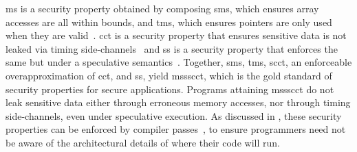 \documentclass[dvipsnames,conference]{IEEEtran}
\theoremstyle{definition}
\begin{document}

\gls*{ms} is a security property obtained by composing \gls*{sms}, which ensures array accesses are all within bounds, and \gls*{tms}, which ensures pointers are only used when they are valid~\cite{azevedo2018meaningsofms,jim2002cyclone,necula2005ccured,nagarakatte2010cets,nagarakatte2009soft,akritidis2009baggy,michael2023mswasm}.
\gls*{cct} is a security property that ensures sensitive data is not leaked via timing side-channels~\cite{kocher1996timing} and \gls*{ss} is a security property that enforces the same but under a speculative semantics~\cite{guarnieri2018spectector}.
Together, \gls*{sms}, \gls*{tms}, \gls*{scct}, an enforceable overapproximation of \gls*{cct}, and \gls*{ss}, yield \gls*{mssscct}, which is the gold standard of security properties for secure applications.
Programs attaining \gls*{mssscct} do not leak sensitive data either through erroneous memory accesses, nor through timing side-channels, even under speculative execution.
As discussed in , these security properties can be enforced by compiler passes~\cite{bond2017vale,almeida2017jasmin}, to ensure programmers need not be aware of the architectural details of where their code will run.
\end{document}
